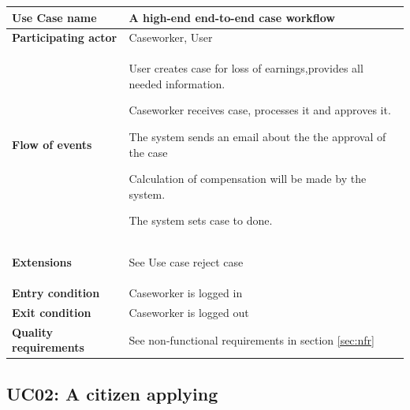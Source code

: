 \begin{table}[htb!]
\begin{tabularx}{\textwidth}{l|X}
	\textbf{Use Case name} & A high-end end-to-end case workflow \\
	\hline
	\textbf{Participating actor} & Caseworker, User\\
	\hline
	\textbf{Flow of events} &
	\vspace{-2mm}
	\begin{compactenum}
			\item User creates case for loss of earnings,provides all needed information.
			\item Caseworker receives case, processes it and approves it.
			\item The system sends an email about the the approval of the case
			\item Calculation of compensation will be made by the system.
			\item The system sets case to done.
	\end{compactenum}\\
	\hline
	\textbf{Extensions} & 
		\vspace{-2mm}
	    \begin{compactenum}
	        \setcounter{enumi}{1}
	        \item See Use case reject case
	    \end{compactenum}\\
	\hline
	\textbf{Entry condition} &
	Caseworker is logged in
	\\
	\hline
	\textbf{Exit condition} & Caseworker is logged out\\
	\hline
	\textbf{Quality requirements} & See non-functional requirements in section \ref{sec:nfr}\\
\end{tabularx}
\end{table}

\subsection{UC02: A citizen applying}

